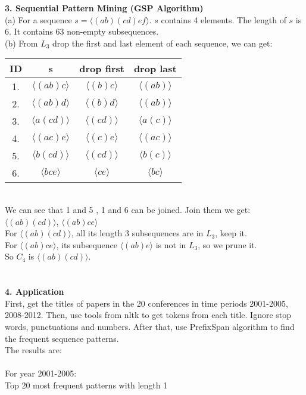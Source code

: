 \documentclass[11pt,a4paper,fleqn]{article}
\begin{document}
\newpage \noindent
\textbf{3. Sequential Pattern Mining (GSP Algorithm)}\\
(a) For a sequence $s=\langle (ab)(cd)ef\rangle $. $s$ contains 4 elements. The length of $s$ is 6. It contains 63 non-empty subsequences.\\
(b) From $L_3$ drop the first and last element of each sequence, we can get:\\
\begin{tabular}{|c|c|c|c|}
\hline
ID&s&drop first&drop last\\
\hline
1.&$\langle (ab)c\rangle $&$\langle (b)c\rangle $&$\langle (ab)\rangle $\\
2.&$\langle (ab)d\rangle $&$\langle (b)d\rangle $&$\langle (ab)\rangle $\\
3.&$\langle a(cd)\rangle $&$\langle (cd)\rangle $&$\langle a(c)\rangle $\\
4.&$\langle (ac)e\rangle $&$\langle (c)e\rangle $&$\langle (ac)\rangle $\\
5.&$\langle b(cd)\rangle $&$\langle (cd)\rangle $&$\langle b(c)\rangle $\\
6.&$\langle bce\rangle $&$\langle ce\rangle $&$\langle bc\rangle $\\
\hline
\end{tabular}\\
We can see that 1 and 5 , 1 and 6 can be joined. Join them we get:\\
$\langle (ab)(cd)\rangle $, $\langle (ab)ce\rangle $\\
For $\langle (ab)(cd)\rangle $, all its length 3 subsequences are in $L_3$, keep it.\\
For $\langle (ab)ce\rangle $, its subsequence $\langle (ab)e\rangle $ is not in $L_3$, so we prune it.\\
So $C_4$ is  $\langle (ab)(cd)\rangle $.\\ \\ \\
\textbf{4. Application}\\
First, get the titles of papers in the 20 conferences in time periods 2001-2005, 2008-2012. Then, use tools from nltk to get tokens from each title. Ignore stop words, punctuations and numbers. After that, use PrefixSpan algorithm to find the frequent sequence patterns. \\The results are:\\ \\ \noindent
For year 2001-2005:\\
Top 20 most frequent patterns with length 1
\end{document}
